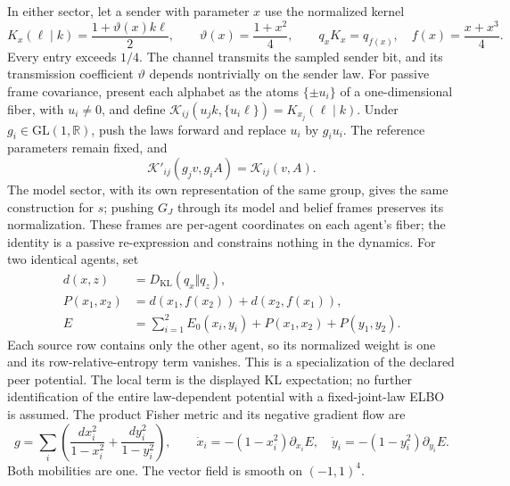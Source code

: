In either sector, let a sender with parameter $x$ use the normalized kernel
\begin{equation}
 K_x(\ell\mid k)=\frac{1+\vartheta(x)k\ell}{2},\qquad
 \vartheta(x)=\frac{1+x^2}{4},\qquad
 q_xK_x=q_{f(x)},\quad f(x)=\frac{x+x^3}{4}.
 \label{inh:smooth-channel}
\end{equation}
Every entry exceeds $1/4$. The channel transmits the sampled sender bit,
and its transmission coefficient $\vartheta$ depends nontrivially on the
sender law. For passive frame covariance, present each alphabet as the atoms
$\{\pm u_i\}$ of a one-dimensional fiber, with $u_i\ne0$, and define
$\mathcal K_{ij}(u_jk,\{u_i\ell\})=K_{x_j}(\ell\mid k)$.
Under $g_i\in\mathrm{GL}(1,\mathbb R)$, push the laws forward and replace
$u_i$ by $g_i u_i$. The reference parameters remain fixed, and
\begin{equation}
 \mathcal K'_{ij}(g_jv,g_iA)=\mathcal K_{ij}(v,A).
 \label{inh:smooth-channel-covariance}
\end{equation}
The model sector, with its own representation of the same group, gives the same construction for $s$; pushing
$G_J$ through its model and belief frames preserves its normalization.
These frames are per-agent coordinates on each agent's fiber; the identity
is a passive re-expression and constrains nothing in the dynamics.
For two identical agents, set
\begin{equation}
 \begin{aligned}
 d(x,z)&=D_{\mathrm{KL}}(q_x\Vert q_z),\\
 P(x_1,x_2)&=d(x_1,f(x_2))+d(x_2,f(x_1)),\\
 E&=\sum_{i=1}^2 E_0(x_i,y_i)
       +P(x_1,x_2)+P(y_1,y_2).
 \end{aligned}
 \label{inh:smooth-peer-energy}
\end{equation}
Each source row contains only the other agent, so its normalized weight is
one and its row-relative-entropy term vanishes. This is a specialization
of the declared peer potential. The local term is the displayed KL
expectation; no further identification of the entire law-dependent
potential with a fixed-joint-law ELBO is assumed.
The product Fisher metric and its negative gradient flow are
\begin{equation}
 g=\sum_i\left(\frac{dx_i^2}{1-x_i^2}
                 +\frac{dy_i^2}{1-y_i^2}\right),\qquad
 \dot x_i=-(1-x_i^2)\partial_{x_i}E,\quad
 \dot y_i=-(1-y_i^2)\partial_{y_i}E.
 \label{inh:smooth-fisher-flow}
\end{equation}
Both mobilities are one. The vector field is smooth on $(-1,1)^4$.

